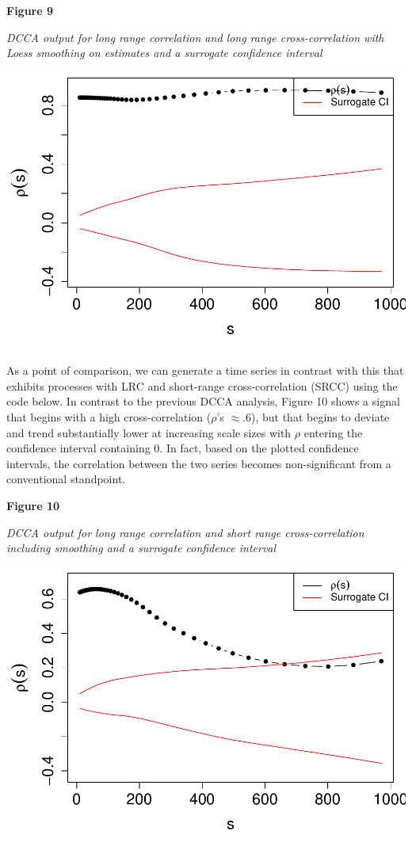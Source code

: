 \documentclass[
  man]{apa6}
\begin{document}
\textbf{Figure 9}

\emph{DCCA output for long range correlation and long range cross-correlation
with Loess smoothing on estimates and a surrogate confidence interval}

\includegraphics{fractal_regression_paper_brm_files/figure-latex/unnamed-chunk-18-1.pdf}

As a point of comparison, we can generate a time series in contrast with
this that exhibits processes with LRC and short-range cross-correlation
(SRCC) using the code below. In contrast to the previous DCCA analysis,
Figure 10 shows a signal that begins with a high cross-correlation
(\(\rho\)'s \(\approx .6\)), but that begins to deviate and trend
substantially lower at increasing scale sizes with \(\rho\) entering the
confidence interval containing 0. In fact, based on the plotted
confidence intervals, the correlation between the two series becomes
non-significant from a conventional standpoint.

\textbf{Figure 10}

\emph{DCCA output for long range correlation and short range
cross-correlation including smoothing and a surrogate confidence
interval}

\includegraphics{fractal_regression_paper_brm_files/figure-latex/unnamed-chunk-20-1.pdf}
\end{document}
